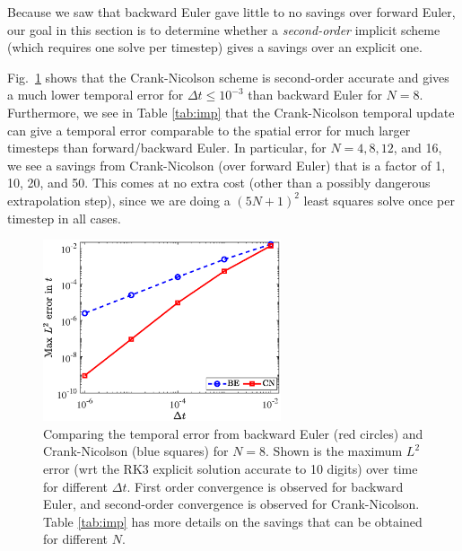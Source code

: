 Because we saw that backward Euler gave little to no savings over forward Euler, our goal in this section is to determine whether a \textit{second-order} implicit scheme (which requires one solve per timestep) gives a savings over an explicit one. 
 
Fig.\ \ref{fig:FECN} shows that the Crank-Nicolson scheme is second-order accurate and gives a much lower temporal error for $\Delta t \leq 10^{-3}$ than backward Euler for $N=8$. Furthermore, we see in Table \ref{tab:imp} that the Crank-Nicolson temporal update can give a temporal error comparable to the spatial error for much larger timesteps than forward/backward Euler. In particular, for $N=4, 8, 12$, and 16, we see a savings from Crank-Nicolson (over forward Euler) that is a factor of 1, 10, 20, and 50. This comes at no extra cost (other than a possibly dangerous extrapolation step), since we are doing a $(5N+1)^2$ least squares solve once per timestep in all cases. 

\begin{figure}
\centering 
\includegraphics[width=70mm]{Local/FECN.eps}
\caption{Comparing the temporal error from backward Euler (red circles) and Crank-Nicolson (blue squares) for $N=8$. Shown is the maximum $L^2$ error (wrt the RK3 explicit solution accurate to 10 digits) over time for different $\Delta t$. First order convergence is observed for backward Euler, and second-order convergence is observed for Crank-Nicolson. Table \ref{tab:imp} has more details on the savings that can be obtained for different $N$.  } 
\label{fig:FECN}
\end{figure}